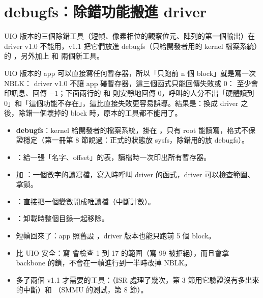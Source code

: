 \section{debugfs：除錯功能搬進 driver}
\label{sec:debugfs}

\begin{oneline}
UIO 版本的三個除錯工具（短幀、像素相位的觀察位元、陣列的第一個輸出）在 driver v1.0 不能用，v1.1 把它們放進 debugfs（只給開發者用的 kernel 檔案系統）的 ，另外加上  和  兩個新工具。
\end{oneline}

\begin{before}
UIO 版本的 app 可以直接寫任何暫存器，所以「只跑前 n 個 block」就是寫一次 NBLK：
driver v1.0 不讓 app 碰暫存器，這三個函式只能回傳失敗或 0：
 至少會印訊息、回傳 $-1$；下面兩行的  和  則安靜地回傳 0，呼叫的人分不出「硬體讀到 0」和「這個功能不存在」，這比直接失敗更容易誤導。結果是：換成 driver 之後，除錯一個壞掉的 block 時，原本的工具都不能用了。
\end{before}

\begin{tech}
\begin{itemize}
\item \textbf{debugfs}：kernel 給開發者的檔案系統，掛在 ，只有 root 能讀寫，格式不保證穩定（第一冊第 8 節說過：正式的狀態放 sysfs，除錯用的放 debugfs）。
\item {}：給一張「名字、offset」的表，讀檔時一次印出所有暫存器。
\item {} 加 ：一個數字的讀寫檔，寫入時呼叫 driver 的函式，driver 可以檢查範圍、拿鎖。
\item {}：直接把一個變數開成唯讀檔（中斷計數）。
\item {}：卸載時整個目錄一起移除。
\end{itemize}
\end{tech}

\begin{gain}
\begin{itemize}
\item 短幀回來了：app 照舊設 ，driver 版本也能只跑前 5 個 block。
\item 比 UIO 安全：寫  會檢查 1 到 17 的範圍（寫 99 被拒絕），而且會拿 backbone 的鎖，不會在一幀進行到一半時改掉 NBLK。
\item 多了兩個 v1.1 才需要的工具：（ISR 處理了幾次，第 3 節用它驗證沒有多出來的中斷）和 （SMMU 的測試，第 8 節）。
\end{itemize}
\end{gain}

